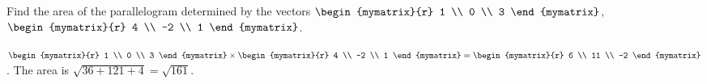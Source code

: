 \begin{ex}
  Find the area of the parallelogram determined by the vectors
  $\begin{mymatrix}{r}
    1 \\
    0 \\
    3
  \end{mymatrix}$, $\begin{mymatrix}{r}
    4 \\
    -2 \\
    1
  \end{mymatrix}$.
  \begin{sol}
    $\begin{mymatrix}{r}
      1 \\
      0 \\
      3
    \end{mymatrix} \times
    \begin{mymatrix}{r}
      4 \\
      -2 \\
      1
    \end{mymatrix} =\begin{mymatrix}{r}
      6 \\
      11 \\
      -2
    \end{mymatrix}$. The area is $\sqrt{36+121+4}= \sqrt{161}$.
  \end{sol}
\end{ex}

